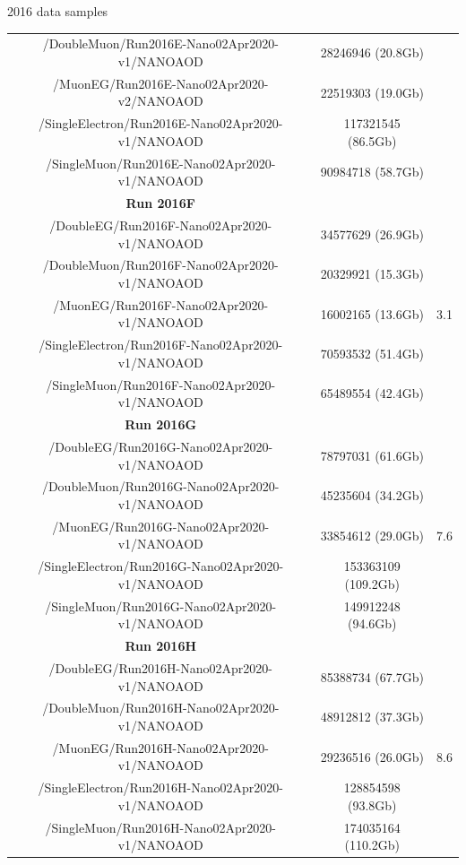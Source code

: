 \documentclass[8pt]{beamer}
\begin{document}
\begin{frame}{2016 data samples}
\begin{table}
\begin{center}
{\begin{tabular}{ c|c|c }
 /DoubleMuon/Run2016E-Nano02Apr2020-v1/NANOAOD & 28246946 (20.8Gb) & \\
 /MuonEG/Run2016E-Nano02Apr2020-v2/NANOAOD & 22519303 (19.0Gb) & \\
 /SingleElectron/Run2016E-Nano02Apr2020-v1/NANOAOD & 117321545 (86.5Gb) & \\
 /SingleMuon/Run2016E-Nano02Apr2020-v1/NANOAOD & 90984718 (58.7Gb) & \\
 \hline
 \textbf{Run 2016F} & & \\
 /DoubleEG/Run2016F-Nano02Apr2020-v1/NANOAOD & 34577629 (26.9Gb) & \multirow{ 5}{*}{3.1} \\
 /DoubleMuon/Run2016F-Nano02Apr2020-v1/NANOAOD & 20329921 (15.3Gb) & \\
 /MuonEG/Run2016F-Nano02Apr2020-v1/NANOAOD & 16002165 (13.6Gb) & \\
 /SingleElectron/Run2016F-Nano02Apr2020-v1/NANOAOD & 70593532 (51.4Gb) & \\
 /SingleMuon/Run2016F-Nano02Apr2020-v1/NANOAOD & 65489554 (42.4Gb) & \\
 \hline
 \textbf{Run 2016G} & & \\
 /DoubleEG/Run2016G-Nano02Apr2020-v1/NANOAOD & 78797031 (61.6Gb) & \multirow{ 5}{*}{7.6} \\
 /DoubleMuon/Run2016G-Nano02Apr2020-v1/NANOAOD & 45235604 (34.2Gb) & \\
 /MuonEG/Run2016G-Nano02Apr2020-v1/NANOAOD & 33854612 (29.0Gb) & \\
 /SingleElectron/Run2016G-Nano02Apr2020-v1/NANOAOD & 153363109 (109.2Gb) & \\
 /SingleMuon/Run2016G-Nano02Apr2020-v1/NANOAOD & 149912248 (94.6Gb) & \\
 \hline
 \textbf{Run 2016H} & & \\
 /DoubleEG/Run2016H-Nano02Apr2020-v1/NANOAOD & 85388734 (67.7Gb) & \multirow{ 5}{*}{8.6} \\
 /DoubleMuon/Run2016H-Nano02Apr2020-v1/NANOAOD & 48912812 (37.3Gb) & \\
 /MuonEG/Run2016H-Nano02Apr2020-v1/NANOAOD & 29236516 (26.0Gb) & \\
 /SingleElectron/Run2016H-Nano02Apr2020-v1/NANOAOD & 128854598 (93.8Gb) & \\
 /SingleMuon/Run2016H-Nano02Apr2020-v1/NANOAOD & 174035164 (110.2Gb) & \\
 \hline
\end{tabular}
}
\end{center}
\end{table}
\end{frame}
\end{document}
